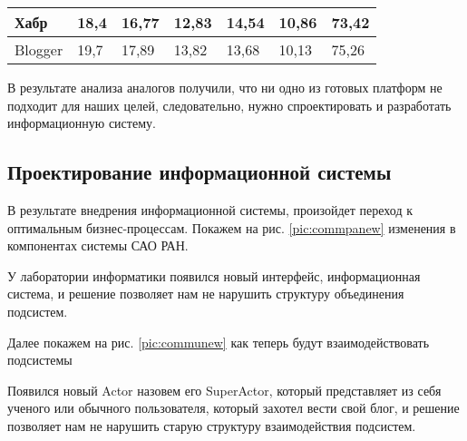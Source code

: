 \begin{table}[H]
\begin{center}
\begin{tabular}{|l|l|l|l|l|l|l|l|}
Хабр                          & 18,4                                                                                   & 16,77                                                                & 12,83                                                                 & 14,54                                                                                  & 10,86                                                                           & \multicolumn{2}{l|}{73,42}                 \\ \hline
Blogger                       & 19,7                                                                                   & 17,89                                                                & 13,82                                                                 & 13,68                                                                                  & 10,13                                                                           & \multicolumn{2}{l|}{75,26}                 \\ \hline
\end{tabular}
	\end{center}
\end{table}


В результате анализа аналогов получили, что ни одно из готовых платформ не подходит для наших целей, следовательно, нужно спроектировать и разработать информационную систему.

\pagebreak

\subsection{Проектирование информационной системы}

В результате внедрения информационной системы, произойдет переход к оптимальным бизнес-процессам. Покажем на рис. \ref{pic:commpanew} изменения в компонентах системы САО РАН. 


У лаборатории информатики появился новый интерфейс, информационная система, и решение позволяет нам не нарушить структуру объединения подсистем. 

Далее покажем на рис. \ref{pic:communew} как теперь будут взаимодействовать подсистемы


Появился новый Actor назовем его SuperActor, который представляет из себя ученого или обычного пользователя, который захотел вести свой блог, и решение позволяет нам не нарушить старую структуру взаимодействия подсистем.

